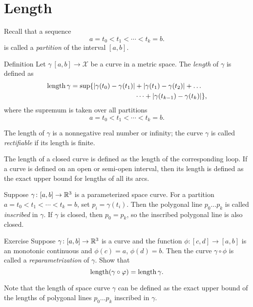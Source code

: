 \chapter{Length}
 
Recall that a sequence 
\[a=t_0 < t_1 < \cdots < t_k=b.\]
is called a \emph{partition} of the interval $[a,b]$.

\begin{thm}{Definition}\label{def:length}
Let $\gamma\:[a,b]\to \mathcal{X}$ be a curve in a metric space.
The \emph{length} of $\gamma$ is defined as
\begin{align*}
\mathop{\rm length}\nolimits \gamma
= 
\sup \{|\gamma(t_0)-\gamma(t_1)|&+|\gamma(t_1)-\gamma(t_2)|+\dots
\\
&\dots+|\gamma(t_{k-1})-\gamma(t_k)|\},
\end{align*}
where the supremum is taken over all partitions
\[a=t_0 < t_1 < \cdots < t_k=b.\]

The length of $\gamma$ is a nonnegative real number or infinity;
the curve $\gamma$ is called \emph{rectifiable} if its length is finite. 

The length of a closed curve is defined as the length of the corresponding loop.
If a curve is defined on an open or semi-open interval, then its length is defined as the exact upper bound for lengths of all its arcs.
\end{thm}

Suppose $\gamma\colon[a,b]\to \mathbb{R}^3$ is a parameterized space curve.
For a partition $a=t_0 < t_1 < \cdots < t_k=b$, set $p_i=\gamma(t_i)$.
Then the polygonal line $p_0\dots p_k$ is called \emph{inscribed} in $\gamma$.
If $\gamma$ is closed, then $p_0=p_k$, so the inscribed polygonal line is also closed.

\begin{thm}{Exercise}\label{ex:integral-length-0}
Suppose $\gamma\colon[a,b] \to\mathbb{R}^3$ is a curve and the function $\phi : [c,d] \to [a,b]$ is an monotonic continuous and $\phi(c)=a$, $\phi(d)=b$.
Then the curve $\gamma \circ \phi$ is called a 
\emph{reparametrization} of $\gamma$.
Show that 
\[\mathop{\rm length}\nolimits (\gamma \circ \varphi) = \mathop{\rm length}\nolimits \gamma.\]

\end{thm}

Note that the length of space curve $\gamma$ can be defined as the exact upper bound of the lengths of polygonal lines $p_0\dots p_k$ inscribed in $\gamma$.

